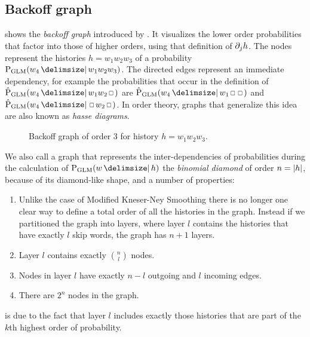 \subsection{Backoff graph}
\label{subsec:backoff-graph}

 shows the \emph{backoff graph} introduced by
\textcite{BilmesKirchhoff2003}.
It visualizes the lower order probabilities that factor into those of higher
orders, using that definition of $\SkpOp[j]{h}$.
The nodes represent the histories $h = w_1 w_2 w_3$ of a probability
$\ProbGLM{w_4}{w_1 w_2 w_3}$.
The directed edges represent an immediate dependency, for example the
probabilities that occur in the definition of
$\ProbGLM*{w_4}{w_1 w_2 \Skp}$ are $\ProbGLM*{w_4}{w_1 \Skp \Skp}$ and
$\ProbGLM*{w_4}{\Skp w_2 \Skp}$.
In order theory, graphs that generalize this idea are also known as
\emph{hasse diagrams}.

\begin{figure}
  \centering
  
  \caption{
    Backoff graph of order 3 for history $h = w_1 w_2 w_3$.
  }
  \label{fig:history-glm}
\end{figure}


We also call a graph that represents the inter-dependencies of probabilities
during the calculation of $\ProbGLM{w}{h}$ the \emph{binomial diamond} of order
$n = {\left|h\right|}$, because of its diamond-like shape, and a number of
properties:

\begin{enumerate}
  \item \label{itm:num-layers} Unlike the case of Modified Kneser-Ney Smoothing
    there is no longer one clear way to define a total order of all the
    histories in the graph.
    Instead if we partitioned the graph into layers, where layer $l$ contains
    the histories that have exactly $l$ skip words, the graph has $n + 1$ layers.
  \item \label{itm:num-childs} Layer $l$ contains exactly $\binom{n}{l}$ nodes.
  \item \label{itm:num-edges}  Nodes in layer $l$ have exactly $n - l$ outgoing
    and $l$ incoming edges.
  \item \label{itm:num-nodes}  There are $2^n$ nodes in the graph.
\end{enumerate}

 is due to the fact that layer $l$ includes exactly those
histories that are part of the $k$th highest order of probability.

